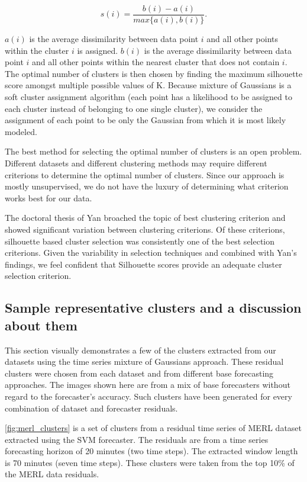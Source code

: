 \begin{equation}
s(i) = \frac{b(i) - a(i)}{max\{a(i), b(i)\}}.
\end{equation}

$a(i)$ is the average dissimilarity between data point $i$ and all other points within the cluster $i$ is assigned.  $b(i)$ is the average dissimilarity between data point $i$ and all other points within the nearest cluster that does not contain $i$.  The optimal number of clusters is then chosen by finding the maximum silhouette score amongst multiple possible values of K.  Because mixture of Gaussians is a soft cluster assignment algorithm (each point has a likelihood to be assigned to each cluster instead of belonging to one single cluster), we consider the assignment of each point to be only the Gaussian from which it is most likely modeled.

The best method for selecting the optimal number of clusters is an open problem.  Different datasets and different clustering methods may require different criterions to determine the optimal number of clusters.  Since our approach is mostly unsupervised, we do not have the luxury of determining what criterion works best for our data.   

The doctoral thesis \cite{Yan2005} of Yan broached the topic of best clustering criterion and showed significant variation between clustering criterions.  Of these criterions, silhouette based cluster selection was consistently one of the best selection criterions.  Given the variability in selection techniques and combined with Yan's findings, we feel confident that Silhouette scores provide an adequate cluster selection criterion.

\subsection{Sample representative clusters and a discussion about them}

This section visually demonstrates a few of the clusters extracted from our datasets using the time series mixture of Gaussians approach.  These residual clusters were chosen from each dataset and from different base forecasting approaches.  The images shown here are from a mix of base forecasters without regard to the forecaster's accuracy.  Such clusters have been generated for every combination of dataset and forecaster residuals.

\ref{fig:merl_clusters} is a set of clusters from a residual time series of MERL dataset extracted using the SVM forecaster.  The residuals are from a time series forecasting horizon of 20 minutes (two time steps).  The extracted window length is 70 minutes (seven time steps).  These clusters were taken from the top 10\% of the MERL data residuals.

